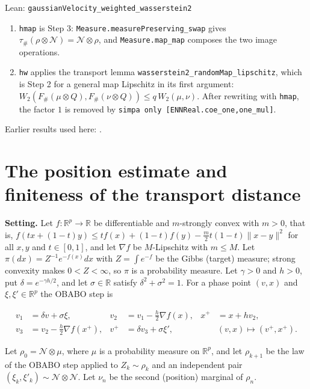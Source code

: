 \documentclass[11pt,a4paper]{article}
\begin{document}
\begin{leanbox}{Lean: \texttt{gaussianVelocity\_\allowbreak{}weighted\_\allowbreak{}wasserstein2}}
\begin{enumerate}
\item \texttt{hmap} is Step 3: \texttt{Measure.\allowbreak{}measure\allowbreak{}Preserving\_\allowbreak{}swap} gives \(\tau_\#(\rho\otimes\mathcal N)=\mathcal N\otimes\rho\), and \texttt{Measure.\allowbreak{}map\_\allowbreak{}map} composes the two image operations.

\item \texttt{hw} applies the transport lemma \texttt{wasserstein2\_\allowbreak{}random\allowbreak{}Map\_\allowbreak{}lipschitz}, which is Step 2 for a general map Lipschitz in its first argument: \(W_2(F_\#(\mu\otimes Q),F_\#(\nu\otimes Q))\le q\,W_2(\mu,\nu)\). After rewriting with \texttt{hmap}, the factor \(1\) is removed by \texttt{simpa only [ENNReal.\allowbreak{}coe\_\allowbreak{}one,one\_\allowbreak{}mul]}.

\end{enumerate}
\end{leanbox}


Earlier results used here: \cite[Section~3.17.3]{LangevinLean2026ULASC}.

\section{\texorpdfstring{The position estimate and finiteness of the transport distance}{The position estimate and finiteness of the transport distance}}


\textbf{Setting.} Let \(f:\mathbb R^p\to\mathbb R\) be differentiable and \(m\)-strongly convex with \(m>0\), that is, \(f(tx+(1-t)y)\le tf(x)+(1-t)f(y)-\tfrac m2t(1-t)\|x-y\|^2\) for all \(x,y\) and \(t\in[0,1]\), and let \(\nabla f\) be \(M\)-Lipschitz with \(m\le M\). Let \(\pi(dx)=Z^{-1}e^{-f(x)}dx\) with \(Z=\int e^{-f}\) be the Gibbs (target) measure; strong convexity makes \(0<Z<\infty\), so \(\pi\) is a probability measure. Let \(\gamma>0\) and \(h>0\), put \(\delta=e^{-\gamma h/2}\), and let \(\sigma\in\mathbb R\) satisfy \(\delta^2+\sigma^2=1\). For a phase point \((v,x)\) and \(\xi,\xi'\in\mathbb R^p\) the OBABO step is


\[\begin{aligned}
v_1&=\delta v+\sigma\xi, & v_2&=v_1-\tfrac h2\nabla f(x), & x^+&=x+hv_2,\\
v_3&=v_2-\tfrac h2\nabla f(x^+), & v^+&=\delta v_3+\sigma\xi', & &(v,x)\mapsto(v^+,x^+).
\end{aligned}\]


Let \(\rho_0=\mathcal N\otimes\mu\), where \(\mu\) is a probability measure on \(\mathbb R^p\), and let \(\rho_{k+1}\) be the law of the OBABO step applied to \(Z_k\sim\rho_k\) and an independent pair \((\xi_k,\xi'_k)\sim\mathcal N\otimes\mathcal N\). Let \(\nu_n\) be the second (position) marginal of \(\rho_n\).
\end{document}
